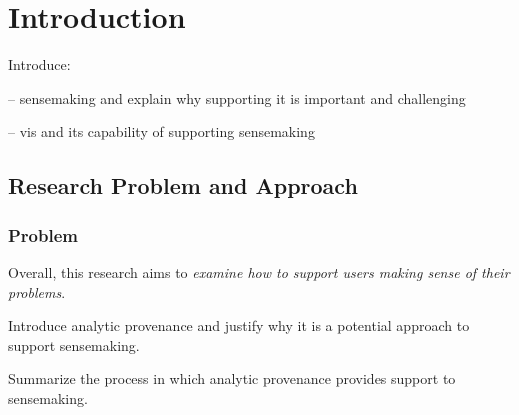 \chapter{Introduction}

\graphicspath{{Chapter1/figures/}}

Introduce:

-- sensemaking and explain why supporting it is important and challenging

-- vis and its capability of supporting sensemaking

\section{Research Problem and Approach}
\subsection{Problem}
Overall, this research aims to \emph{examine how to support users making sense of their problems}. 

Introduce analytic provenance and justify why it is a potential approach to support sensemaking.

Summarize the process in which analytic provenance provides support to sensemaking.


